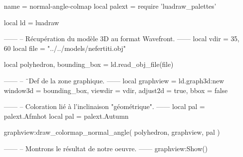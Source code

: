 \documentclass[border = 3pt]{standalone}
\begin{document}
\begin{luadraw*}{name = normal-angle-colmap}
local palext = require 'luadraw_palettes'

local ld = luadraw

------
-- Récupération du modèle 3D au format Wavefront.
------
local vdir = {35, 60}
local file = "../../models/nefertiti.obj"

local polyhedron, bounding_box = ld.read_obj_file(file)


------
-- ¨Def de la zone graphique.
------
local graphview = ld.graph3d:new{
  window3d = bounding_box,
  viewdir  = vdir,
  adjust2d = true,
  bbox     = false
}

------
-- Coloration lié à l'inclinaison "géométrique".
------
local pal = palext.Afmhot
local pal = palext.Autumn

graphview:draw_colormap_normal_angle(
  polyhedron,
  graphview,
  pal
)

------
-- Montrons le résultat de notre oeuvre.
------
graphview:Show()
\end{luadraw*}
\end{document}

